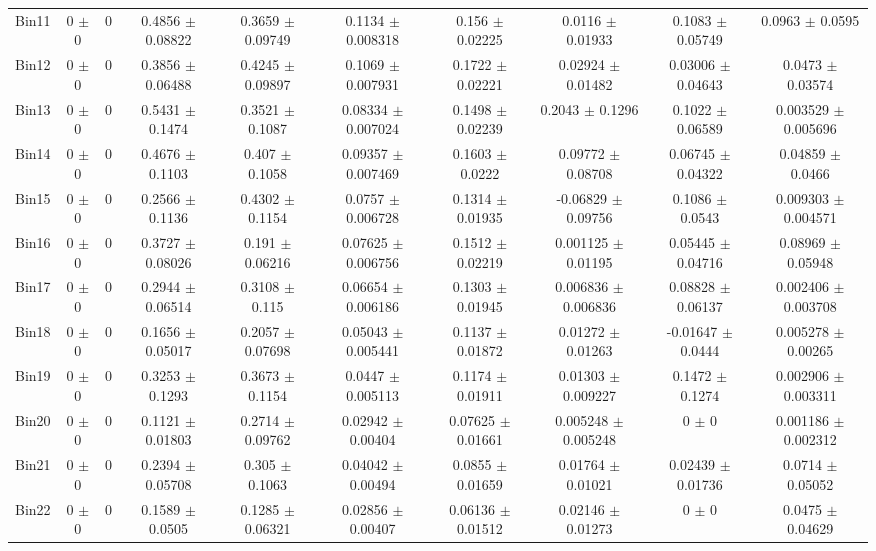 \begin{tabular}{@{\extracolsep{4pt}}lccccccccc@{}}
     Bin11 & 0 $\pm$ 0 & 0 & 0.4856 $\pm$ 0.08822 & 0.3659 $\pm$ 0.09749 & 0.1134 $\pm$ 0.008318 & 0.156 $\pm$ 0.02225 & 0.0116 $\pm$ 0.01933 & 0.1083 $\pm$ 0.05749 & 0.0963 $\pm$ 0.0595 \\ 
     Bin12 & 0 $\pm$ 0 & 0 & 0.3856 $\pm$ 0.06488 & 0.4245 $\pm$ 0.09897 & 0.1069 $\pm$ 0.007931 & 0.1722 $\pm$ 0.02221 & 0.02924 $\pm$ 0.01482 & 0.03006 $\pm$ 0.04643 & 0.0473 $\pm$ 0.03574 \\ 
     Bin13 & 0 $\pm$ 0 & 0 & 0.5431 $\pm$ 0.1474 & 0.3521 $\pm$ 0.1087 & 0.08334 $\pm$ 0.007024 & 0.1498 $\pm$ 0.02239 & 0.2043 $\pm$ 0.1296 & 0.1022 $\pm$ 0.06589 & 0.003529 $\pm$ 0.005696 \\ 
     Bin14 & 0 $\pm$ 0 & 0 & 0.4676 $\pm$ 0.1103 & 0.407 $\pm$ 0.1058 & 0.09357 $\pm$ 0.007469 & 0.1603 $\pm$ 0.0222 & 0.09772 $\pm$ 0.08708 & 0.06745 $\pm$ 0.04322 & 0.04859 $\pm$ 0.0466 \\ 
     Bin15 & 0 $\pm$ 0 & 0 & 0.2566 $\pm$ 0.1136 & 0.4302 $\pm$ 0.1154 & 0.0757 $\pm$ 0.006728 & 0.1314 $\pm$ 0.01935 & -0.06829 $\pm$ 0.09756 & 0.1086 $\pm$ 0.0543 & 0.009303 $\pm$ 0.004571 \\ 
     Bin16 & 0 $\pm$ 0 & 0 & 0.3727 $\pm$ 0.08026 & 0.191 $\pm$ 0.06216 & 0.07625 $\pm$ 0.006756 & 0.1512 $\pm$ 0.02219 & 0.001125 $\pm$ 0.01195 & 0.05445 $\pm$ 0.04716 & 0.08969 $\pm$ 0.05948 \\ 
     Bin17 & 0 $\pm$ 0 & 0 & 0.2944 $\pm$ 0.06514 & 0.3108 $\pm$ 0.115 & 0.06654 $\pm$ 0.006186 & 0.1303 $\pm$ 0.01945 & 0.006836 $\pm$ 0.006836 & 0.08828 $\pm$ 0.06137 & 0.002406 $\pm$ 0.003708 \\ 
     Bin18 & 0 $\pm$ 0 & 0 & 0.1656 $\pm$ 0.05017 & 0.2057 $\pm$ 0.07698 & 0.05043 $\pm$ 0.005441 & 0.1137 $\pm$ 0.01872 & 0.01272 $\pm$ 0.01263 & -0.01647 $\pm$ 0.0444 & 0.005278 $\pm$ 0.00265 \\ 
     Bin19 & 0 $\pm$ 0 & 0 & 0.3253 $\pm$ 0.1293 & 0.3673 $\pm$ 0.1154 & 0.0447 $\pm$ 0.005113 & 0.1174 $\pm$ 0.01911 & 0.01303 $\pm$ 0.009227 & 0.1472 $\pm$ 0.1274 & 0.002906 $\pm$ 0.003311 \\ 
     Bin20 & 0 $\pm$ 0 & 0 & 0.1121 $\pm$ 0.01803 & 0.2714 $\pm$ 0.09762 & 0.02942 $\pm$ 0.00404 & 0.07625 $\pm$ 0.01661 & 0.005248 $\pm$ 0.005248 & 0 $\pm$ 0 & 0.001186 $\pm$ 0.002312 \\ 
     Bin21 & 0 $\pm$ 0 & 0 & 0.2394 $\pm$ 0.05708 & 0.305 $\pm$ 0.1063 & 0.04042 $\pm$ 0.00494 & 0.0855 $\pm$ 0.01659 & 0.01764 $\pm$ 0.01021 & 0.02439 $\pm$ 0.01736 & 0.0714 $\pm$ 0.05052 \\ 
     Bin22 & 0 $\pm$ 0 & 0 & 0.1589 $\pm$ 0.0505 & 0.1285 $\pm$ 0.06321 & 0.02856 $\pm$ 0.00407 & 0.06136 $\pm$ 0.01512 & 0.02146 $\pm$ 0.01273 & 0 $\pm$ 0 & 0.0475 $\pm$ 0.04629 \\ 

\end{tabular}
